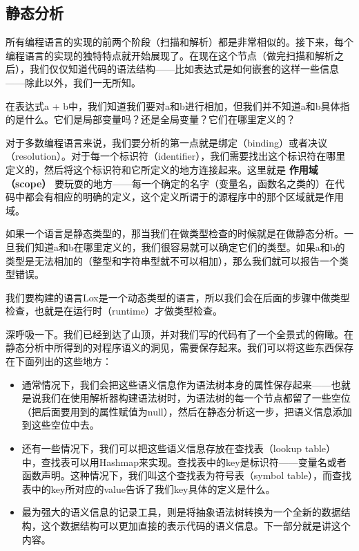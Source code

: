 \documentclass[cn,10pt,math=newtx,citestyle=gb7714-2015,bibstyle=gb7714-2015]{elegantbook}
\begin{document}
\subsection{静态分析}

所有编程语言的实现的前两个阶段（扫描和解析）都是非常相似的。接下来，每个编程语言的实现的独特特点就开始展现了。在现在这个节点（做完扫描和解析之后），我们仅仅知道代码的语法结构——比如表达式是如何嵌套的这样一些信息——除此以外，我们一无所知。

在表达式a + b中，我们知道我们要对a和b进行相加，但我们并不知道a和b具体指的是什么。它们是局部变量吗？还是全局变量？它们在哪里定义的？

对于多数编程语言来说，我们要分析的第一点就是绑定（binding）或者决议（resolution）。对于每一个标识符（identifier），我们需要找出这个标识符在哪里定义的，然后将这个标识符和它所定义的地方连接起来。这里就是 \textbf{作用域（scope）} 要玩耍的地方——每一个确定的名字（变量名，函数名之类的）在代码中都会有相应的明确的定义，这个定义所谓于的源程序中的那个区域就是作用域。

如果一个语言是静态类型的，那当我们在做类型检查的时候就是在做静态分析。一旦我们知道a和b在哪里定义的，我们很容易就可以确定它们的类型。如果a和b的类型是无法相加的（整型和字符串型就不可以相加），那么我们就可以报告一个类型错误。

\begin{tcolorbox}
我们要构建的语言Lox是一个动态类型的语言，所以我们会在后面的步骤中做类型检查，也就是在运行时（runtime）才做类型检查。
\end{tcolorbox}

深呼吸一下。我们已经到达了山顶，并对我们写的代码有了一个全景式的俯瞰。在静态分析中所得到的对程序语义的洞见，需要保存起来。我们可以将这些东西保存在下面列出的这些地方：

\begin{itemize}
   \item 通常情况下，我们会把这些语义信息作为语法树本身的属性保存起来——也就是说我们在使用解析器构建语法树时，为语法树的每一个节点都留了一些空位（把后面要用到的属性赋值为null），然后在静态分析这一步，把语义信息添加到这些空位中去。
   \item 还有一些情况下，我们可以把这些语义信息存放在查找表（lookup table）中，查找表可以用Hashmap来实现。查找表中的key是标识符——变量名或者函数声明。这种情况下，我们叫这个查找表为符号表（symbol table），而查找表中的key所对应的value告诉了我们key具体的定义是什么。
   \item 最为强大的语义信息的记录工具，则是将抽象语法树转换为一个全新的数据结构，这个数据结构可以更加直接的表示代码的语义信息。下一部分就是讲这个内容。
\end{itemize}
\end{document}
